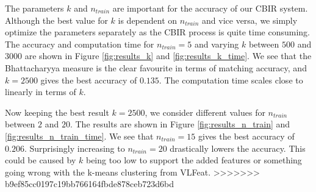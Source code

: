 \documentclass[11pt,a4paper]{article}
\begin{document}
The parameters $k$ and $n_{train}$ are important for the accuracy of our CBIR system. Although the best value for $k$ is dependent on $n_{train}$ and vice versa, we simply optimize the parameters separately as the CBIR process is quite time consuming. The accuracy and computation time for $n_{train} = 5$ and varying $k$ between $500$ and $3000$ are shown in Figure \ref{fig:results_k} and \ref{fig:results_k_time}. We see that the Bhattacharyya measure is the clear favourite in terms of matching accuracy, and $k = 2500$ gives the best accuracy of $0.135$. The computation time scales close to linearly in terms of $k$.

Now keeping the best result $k = 2500$, we consider different values for $n_{train}$ between $2$ and $20$. The results are shown in Figure \ref{fig:results_n_train} and \ref{fig:results_n_train_time}. We see that $n_{train} = 15$ gives the best accuracy of $0.206$. Surprisingly increasing to $n_{train} = 20$ drastically lowers the accuracy. This could be caused by $k$ being too low to support the added features or something going wrong with the k-means clustering from VLFeat.
>>>>>>> b9ef85cc0197c19bb766164fbde878ceb723d6bd
\end{document}
